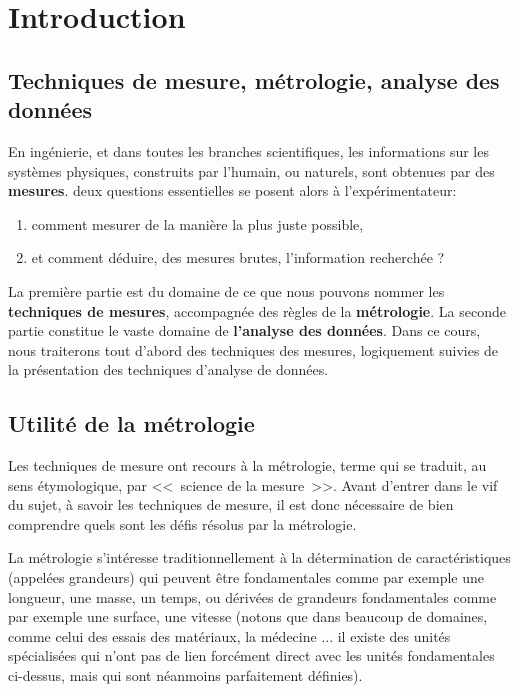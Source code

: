 \chapter{Introduction}
\label{chap:introduction}

\section{Techniques de mesure, métrologie, analyse des données}

En ingénierie, et dans toutes les branches scientifiques, les informations sur les systèmes physiques, construits par l'humain, ou naturels, sont obtenues par des \textbf{mesures}. deux questions essentielles se posent alors à l'expérimentateur:
\begin{enumerate}
\item comment mesurer de la manière la plus juste possible,
\item et comment déduire, des mesures brutes, l'information recherchée ?
\end{enumerate}
La première partie est du domaine de ce que nous pouvons nommer les \textbf{techniques de mesures}, accompagnée des règles de la \textbf{métrologie}. La seconde partie constitue le vaste domaine de \textbf{l'analyse des données}. Dans ce cours, nous traiterons tout d'abord des techniques des mesures, logiquement suivies de la présentation des techniques d'analyse de données.

\section{Utilité de la métrologie}

Les techniques de mesure ont recours à la métrologie, terme qui se traduit, au sens étymologique, par \textless\textless\ science de la mesure\ \textgreater\textgreater. Avant d'entrer dans le vif du sujet, à savoir les techniques de mesure, il est donc nécessaire de bien comprendre quels sont les défis résolus par la métrologie.

La métrologie s'intéresse traditionnellement à la détermination de caractéristiques (appelées grandeurs) qui peuvent être fondamentales comme par exemple une longueur, une masse, un temps, ou dérivées de grandeurs fondamentales comme par exemple une surface, une vitesse (notons que dans beaucoup de domaines, comme celui des essais des matériaux, la médecine ... il existe des unités spécialisées qui n'ont pas de lien forcément direct avec les unités fondamentales ci-dessus, mais qui sont néanmoins parfaitement définies).

